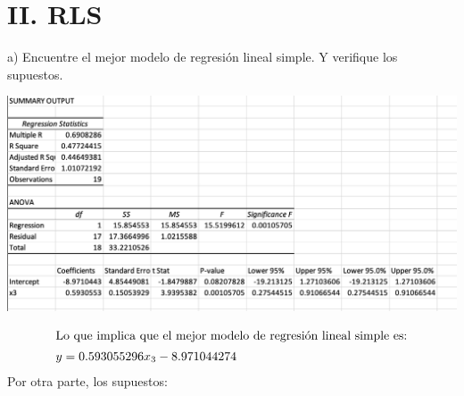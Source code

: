 \documentclass[a4paper,12pt]{article}
\begin{document}
\section{II. RLS}
a) Encuentre el mejor modelo de regresión lineal simple. Y verifique los supuestos.
\begin{center}
     \includegraphics[scale=0.4]{model1.png}
\end{center}
\begin{align}
    \intertext{Lo que implica que el mejor modelo de regresión lineal simple es:}
    y= 0.593055296x_3-8.971044274 
\end{align}
Por otra parte, los supuestos: 
\end{document}
